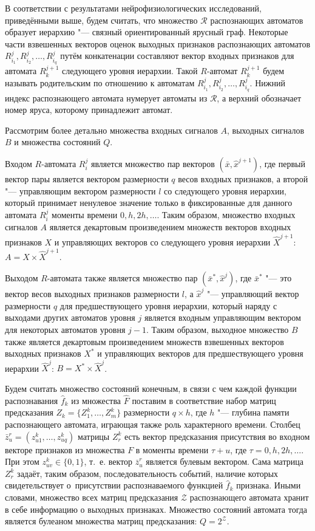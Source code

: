 \documentclass[a4paper, 12pt]{article}
\theoremstyle{plain}
\begin{document}
	В соответствии с результатами нейрофизиологических исследований, приведёнными выше, будем считать, что множество  $\mathcal R$ распознающих автоматов образует иерархию "--- связный ориентированный ярусный граф. Некоторые части взвешенных векторов оценок выходных признаков распознающих автоматов $R_{i_1}^j,R_{i_2}^j,\dots,R_{i_q}^j$ путём конкатенации составляют вектор входных признаков для  автомата $R_k^{j+1}$ следующего уровня иерархии. Такой $R$-автомат $R_k^{j+1}$ будем называть родительским по отношению к автоматам $R_{i_1}^j,R_{i_2}^j,\dots,R_{i_q}^j$. Нижний индекс распознающего автомата нумерует автоматы из $\mathcal R$, а верхний обозначает номер яруса, которому принадлежит автомат.
		
	Рассмотрим более детально множества входных сигналов $A$, выходных сигналов $B$ и множества состояний $Q$.
	
	Входом $R$-автомата $R_i^j$ является множество пар векторов $(\bar x,\hat x^{j+1})$, где первый вектор пары является вектором размерности $q$ весов входных признаков, а второй "--- управляющим вектором размерности $l$ со следующего уровня иерархии, который принимает ненулевое значение только в фиксированные для данного автомата $R_i^j$ моменты времени $0,h,2h,\dots$. Таким образом, множество входных сигналов $A$ является декартовым произведением множеств векторов входных признаков $X$ и управляющих векторов со следующего уровня иерархии $\hat X^{j+1}$: $A=X\times \hat X^{j+1}$. 
	
	Выходом $R$-автомата также является множество пар $(\bar x^*,\hat x^j)$, где $\bar x^*$ "--- это вектор весов выходных признаков размерности $l$, а $\hat x^j$ "--- управляющий вектор размерности $q$ для предшествующего уровня иерархии, который наряду с выходами других автоматов уровня $j$ является входным управляющим вектором для некоторых автоматов уровня $j-1$. Таким образом, выходное множество $B$ также является декартовым произведением множеств взвешенных векторов выходных признаков $X^*$ и управляющих векторов для предшествующего уровня иерархии $\hat X^j$: $B=X^*\times \hat X^j$.
	
	Будем считать множество состояний конечным, в связи с чем каждой функции распознавания $\hat f_k$ из множества $\hat F$ поставим в соответствие набор матриц предсказания $Z_k=\{Z_1^k,…,Z_m^k\}$ размерности $q\times h$, где $h$ "--- глубина памяти распознающего автомата, играющая также роль характерного времени. Столбец $\bar{z}_u^r=(z_{u1}^k,…,z_{uq}^k)$ матрицы $Z_r^k$ есть вектор предсказания присутствия во входном векторе признаков из множества $F$ в моменты времени $\tau+u$, где $\tau = 0,h,2h,\dots$. При этом $z_{uv}^k\in\{0,1\}$, т.~е. вектор $\bar{z}_u^r$ является булевым вектором. Сама матрица $Z_r^k$ задаёт, таким образом, последовательность событий, наличие которых свидетельствует о~присутствии распознаваемого функцией $\hat f_k$ признака. Иными словами, множество всех матриц предсказания $\mathcal Z$ распознающего автомата хранит в себе информацию о выходных признаках. Множество состояний автомата тогда является булеаном множества матриц предсказания: $Q=2^{\mathcal Z}$.
	
\end{document}
